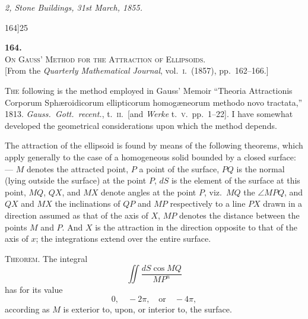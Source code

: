 \documentclass[11pt]{article}
\begin{document}
\bigskip

\noindent\textit{2, Stone Buildings, 31st March, 1855.}

\newpage

\begin{center}
\small 164]\hfill\textsc{25}
\end{center}

\vspace{4em}

\begin{center}
{\large\textbf{164.}}\\[1em]
{\large\scshape On Gauss' Method for the Attraction of Ellipsoids.}\\[1em]
{\small [From the \textit{Quarterly Mathematical Journal}, vol.~\textsc{i}.\ (1857), pp.~162--166.]}
\end{center}

\bigskip

\textsc{The} following is the method employed in Gauss' Memoir ``Theoria Attractionis
Corporum Sph\ae{}roidicorum ellipticorum homog\ae{}neorum methodo novo tractata,'' 1813.
\textit{Gauss.\ Gott.\ recent.}, t.~\textsc{ii}.\ [and \textit{Werke} t.~\textsc{v}.\ pp.~1--22]. I have somewhat developed
the geometrical considerations upon which the method depends.

The attraction of the ellipsoid is found by means of the following theorems, which
apply generally to the case of a homogeneous solid bounded by a closed surface:---
$M$ denotes the attracted point, $P$ a point of the surface, $PQ$ is the normal (lying
outside the surface) at the point $P$, $dS$ is the element of the surface at this point,
$MQ$, $QX$, and $MX$ denote angles at the point $P$, viz.\ $MQ$ the $\angle MPQ$, and $QX$ and
$MX$ the inclinations of $QP$ and $MP$ respectively to a line $PX$ drawn in a direction
assumed as that of the axis of $X$, $MP$ denotes the distance between the points $M$
and $P$. And $X$ is the attraction in the direction opposite to that of the axis of $x$;
the integrations extend over the entire surface.

\medskip

\textsc{Theorem.} The integral
\[
\iint\frac{dS\cos MQ}{MP^{n}}
\]
has for its value
\[
0,\quad -2\pi,\quad \text{or}\quad -4\pi,
\]
according as $M$ is exterior to, upon, or interior to, the surface.
\end{document}
